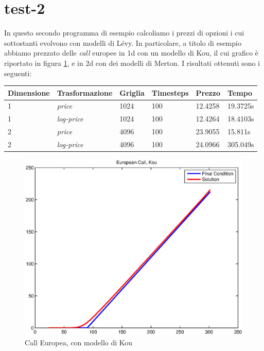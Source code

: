 \documentclass[a4paper,10pt]{report}
\theoremstyle{plain}
\theoremstyle{definition}
\theoremstyle{remark}
\begin{document}
\section{\textsf{test-2}}
In questo secondo programma di esempio calcoliamo i prezzi di opzioni i cui sottostanti evolvono con modelli di L\'evy. In particolare, a titolo di esempio abbiamo prezzato delle \emph{call} europee in 1d con un modello di Kou, il cui grafico \`e riportato in figura \ref{fig:test2-call1d-kou}, e in 2d con dei modelli di Merton. I risultati ottenuti sono i seguenti:
\begin{center}
\begin{tabular}{| l | l | l | l | l | l |}
\hline
Dimensione & Trasformazione & Griglia & Timesteps & Prezzo & Tempo \\ \hline
1 & \emph{price} & 1024 & 100 & 12.4258 & 19.3725s \\ \hline
1 & \emph{log-price} & 1024 & 100 & 12.4264 & 18.4103s \\ \hline
2 & \emph{price} & 4096 & 100 & 23.9055 & 15.811s \\ \hline
2 & \emph{log-price} & 4096 & 100 & 24.0966 & 305.049s \\ \hline
\end{tabular}
\end{center}
\begin{figure}[htp!]
\begin{center}
\includegraphics[width=12cm]{img/test2-call1dkou.eps}
\caption{Call Europea, con modello di Kou}
\label{fig:test2-call1d-kou}
\end{center}
\end{figure}
\end{document}
